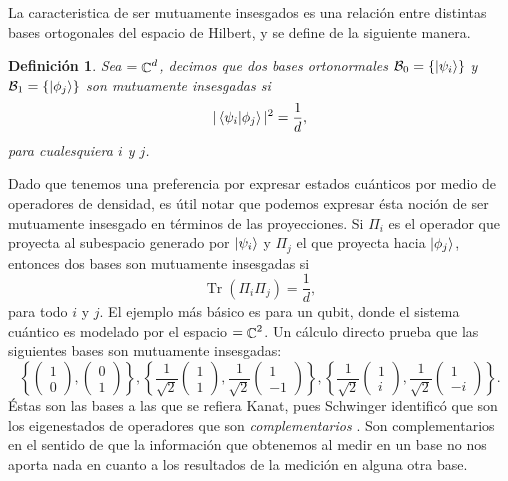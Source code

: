 \documentclass[a4paper]{report}
\DeclareMathOperator{\C}{\mathbb{C}}
\let\H\relax
\DeclareMathOperator{\H}{\mathcal H}
\DeclareMathOperator{\Tr}{Tr}
\newtheorem{definition}{Definición}
\begin{document}
  La caracteristica de ser mutuamente insesgados es una
  relación entre distintas bases ortogonales del espacio de
  Hilbert, y se define de la siguiente manera.
  \begin{definition}
    Sea $\H = \C^{d}$, decimos que dos bases ortonormales
    $\mathcal B_0 = \{\ket{\psi_i}\}$ y $\mathcal B_1 =
    \{\ket{\phi_j}\}$ son mutuamente insesgadas si
    \begin{equation}
      |\braket{\psi_i|\phi_j}|^2
      = \frac{1}{d},
    \end{equation} 
    para cualesquiera $i$ y $j$.
  \end{definition}
  Dado que tenemos una preferencia por expresar estados
  cuánticos por medio de operadores de densidad, es útil
  notar que podemos expresar ésta noción de ser mutuamente
  insesgado en términos de las proyecciones. Si $\Pi_i$ es el
  operador que proyecta al subespacio generado por
  $\ket{\psi_i}$ y $\Pi_j$ el que proyecta hacia
  $\ket{\phi_j}$, entonces dos bases son mutuamente
  insesgadas si
  \begin{equation}
    \Tr\left( \Pi_i \Pi_j \right) 
    = \frac{1}{d},
  \end{equation}
  para todo $i$ y $j$. El ejemplo más básico es para un
  qubit, donde el sistema cuántico es modelado por el
  espacio $\H = \C^2$.  Un cálculo directo prueba que las
  siguientes bases son mutuamente insesgadas:
  \begin{equation}
    \left\{
      \begin{pmatrix} 1\\0 \end{pmatrix},
      \begin{pmatrix} 0\\1 \end{pmatrix}
    \right\},
    \left\{
      \frac{1}{\sqrt{2}} \begin{pmatrix} 1\\1 \end{pmatrix},
      \frac{1}{\sqrt{2}} \begin{pmatrix} 1\\-1 \end{pmatrix}
    \right\},
    \left\{
      \frac{1}{\sqrt{2}} \begin{pmatrix} 1\\i \end{pmatrix},
      \frac{1}{\sqrt{2}} \begin{pmatrix} 1\\-i \end{pmatrix}
    \right\}.
  \end{equation}
  Éstas son las bases a las que se refiera Kanat, pues
  Schwinger identificó que son los eigenestados de
  operadores que son \textit{complementarios}
  \cite{wootters1989}. Son complementarios en el sentido de
  que la información que obtenemos al medir en un base no
  nos aporta nada en cuanto a los resultados de la medición
  en alguna otra base.
\end{document}
